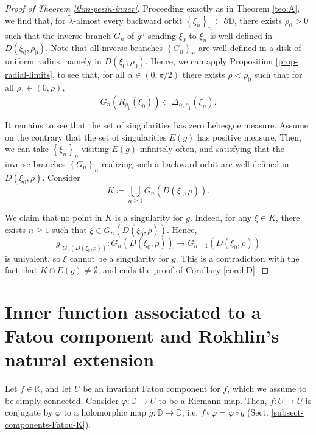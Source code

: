 \documentclass[11pt]{article}
\theoremstyle{definition}
\theoremstyle{remark}
\newcounter{main}
\theoremstyle{plain}
\begin{document}
\begin{proof}[Proof of Theorem \ref{thm-pesin-inner}]
	Proceeding exactly as in Theorem \ref{teo:A}, we find that, for $ \widetilde{\lambda }$-almost every backward orbit $ \left\lbrace \xi_n\right\rbrace_n \subset \partial\mathbb{D}$, there exists $ \rho_0 >0 $ such that
	the inverse branch $ G_n $ of $ g^n $ sending $\xi_0 $ to $ \xi_n $ is well-defined in $ D(\xi_0,\rho_0) $. Note that all inverse branches $ \left\lbrace G_n\right\rbrace_n  $ are well-defined in a disk of uniform radius, namely in $ D(\xi_0,\rho_0) $. Hence, we can apply Proposition  \ref{prop-radial-limits}, to see that, for all $ \alpha\in (0, \pi/2) $ there exists $ \rho<\rho_0 $ such that for all $ \rho_1\in (0, \rho) $, \[ G_n(R_{\rho_1}(\xi_0))\subset \Delta_{ \alpha, \rho_1}(\xi_n).\]
	
	It remains to see that the set of singularities has zero Lebesgue measure. Assume on the contrary that the set of singularities $ E(g) $ has positive measure. Then, 
	we can take $ \left\lbrace \xi_n\right\rbrace_n$ visiting $ E(g) $ infinitely often, and satisfying that the inverse branches $ \left\lbrace G_n\right\rbrace _n $ realizing such a  backward orbit are well-defined in $ D(\xi_0, \rho) $. Consider 
	\[ K\coloneqq \bigcup\limits_{n\geq1} G_n(D(\xi_0, \rho)). \] 
	
	We claim that no point in $ K $ is a singularity for $ g $. Indeed, for any $ \xi\in K $, there exists $ n\geq 1 $ such that $ \xi\in G_n(D(\xi_0, \rho)) $. Hence, \[g|_{G_n(D(\xi_0, \rho))}\colon G_n(D(\xi_0, \rho))\longrightarrow G_{n-1}(D(\xi_0, \rho))\] is univalent, so $ \xi $ cannot be a singularity for $ g $. This is a contradiction with the fact that $ K\cap E(g)\neq\emptyset $, and ends the proof of Corollary \ref{corol:D}.
\end{proof}



\section{Inner function associated to a Fatou component and Rokhlin's natural extension}\label{sect-inner-function-associatedFC}
Let $ f\in\mathbb{K} $, and let $ U $ be an invariant Fatou component for $ f $, which we assume to be simply connected. Consider $ \varphi\colon\mathbb{D}\to U $ to be a Riemann map. Then,  $ f\colon U\to U $ is conjugate by $ \varphi $ to a holomorphic map $ g\colon\mathbb{D}\to\mathbb{D} $, i.e. $ f\circ\varphi=\varphi\circ g$ (Sect. \ref{subsect-components-Fatou-K}).  
\end{document}
